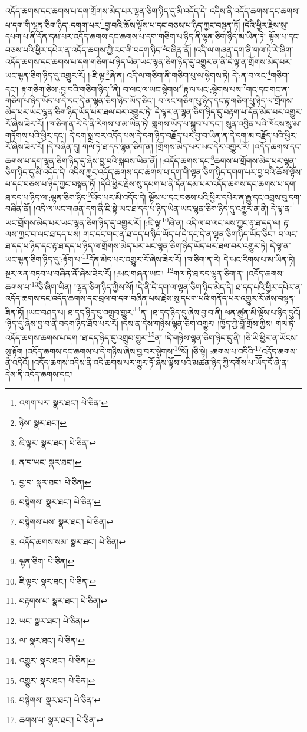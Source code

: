 འདོད་ཆགས་དང་ཆགས་པ་དག་གྲོགས་མེད་པར་ལྷན་ཅིག་ཉིད་དུ་མི་འདོད་དེ། འདིས་ནི་འདོད་ཆགས་དང་ཆགས་པ་དག་གི་ལྷན་ཅིག་ཉིད་:དགག་པར་\footnote{འགག་པར་  སྣར་ཐང་།  པེ་ཅིན། }བྱ་བའི་ཆོས་ལྟོས་པ་དང་བཅས་པ་ཉིད་ཀྱང་བསྟན་ཏོ། །དེའི་ཕྱིར་རྗེས་སུ་དཔག་པ་ནི་དོན་དམ་པར་འདོད་ཆགས་དང་ཆགས་པ་དག་གཅིག་པ་ཉིད་ནི་ལྷན་ཅིག་ཉིད་མ་ཡིན་ཏེ། ལྟོས་པ་དང་བཅས་པའི་ཕྱིར་དཔེར་ན་འདོད་ཆགས་ཀྱི་རང་གི་བདག་ཉིད་\footnote{ཉིས་  སྣར་ཐང་། }བཞིན་ནོ། །འདི་ལ་གཞན་དག་ནི་གལ་ཏེ་རེ་ཞིག་འདོད་ཆགས་དང་ཆགས་པ་དག་གཅིག་པ་ཉིད་ཡིན་ཡང་ལྷན་ཅིག་ཉིད་དུ་འགྱུར་ན་ནི་དེ་ལྟ་ན་གྲོགས་མེད་པར་ཡང་ལྷན་ཅིག་ཉིད་དུ་འགྱུར་རོ། །:ཇི་ལྟ་\footnote{ཇི་ལྟར་  སྣར་ཐང་།  པེ་ཅིན། }ཞེ་ན། འདི་ལ་གཅིག་ནི་གཅིག་པུ་ལ་སྙེགས་ཏེ། དེ་:ན་བ་ལང་\footnote{ན་བ་ཡང་  སྣར་ཐང་། }གཅིག་དང་། རྟ་གཅིག་ཅེས་:བྱ་བའི་གཅིག་ཉིད་\footnote{བྱ་བ་  སྣར་ཐང་།  པེ་ཅིན། }ནི། བ་ལང་ལ་ཡང་སྙེགས་\footnote{བསྙེགས་  སྣར་ཐང་།  པེ་ཅིན། }རྟ་ལ་ཡང་:སྙེགས་པས་\footnote{བསྙེགས་པས་  སྣར་ཐང་།  པེ་ཅིན། }གང་དང་གང་ན་གཅིག་པ་ཉིད་ཡོད་པ་དེ་དང་དེ་ན་ལྷན་ཅིག་ཉིད་ཡོད་ཅིང་། བ་ལང་གཅིག་པུ་ཉིད་དང་རྟ་གཅིག་པུ་ཉིད་ལ་གྲོགས་མེད་པར་ཡང་ལྷན་ཅིག་ཉིད་ཡོད་པར་ཐལ་བར་འགྱུར་ཏེ། དེ་ལྟར་ན་ལྷན་ཅིག་ཉིད་དུ་བརྟག་པ་དོན་མེད་པར་འགྱུར་རོ་ཞེས་ཟེར་རོ། །ཁ་ཅིག་ན་རེ་དེ་ནི་རིགས་པ་མ་ཡིན་ཏེ། གླགས་ཡོད་པ་སྒྲུབ་པ་དང་། སུན་འབྱིན་པའི་ཁོངས་སུ་མ་གཏོགས་པའི་ཕྱིར་དང་། དེ་དག་སྨྲ་བར་འདོད་པས་དེ་དག་ཉིད་བརྗོད་པར་བྱ་བ་ཡིན་ན་དེ་དག་མ་བརྗོད་པའི་ཕྱིར་རོ་ཞེས་ཟེར་རོ། །དེ་བཞིན་དུ། གལ་ཏེ་ཐ་དད་ལྷན་ཅིག་ན། །གྲོགས་མེད་པར་ཡང་དེར་འགྱུར་རོ། །འདོད་ཆགས་དང་ཆགས་པ་དག་ལྷན་ཅིག་ཉིད་དུ་ཞེས་བྱ་བའི་སྐབས་ཡིན་ནོ། །:འདོད་ཆགས་དང་\footnote{འདོད་ཆགས་སམ་  སྣར་ཐང་།  པེ་ཅིན། }ཆགས་པ་གྲོགས་མེད་པར་ལྷན་ཅིག་ཉིད་དུ་མི་འདོད་དེ། འདིས་ཀྱང་འདོད་ཆགས་དང་ཆགས་པ་དག་གི་ལྷན་ཅིག་ཉིད་དགག་པར་བྱ་བའི་ཆོས་ལྟོས་པ་དང་བཅས་པ་ཉིད་ཀྱང་བསྟན་ཏོ། །དེའི་ཕྱིར་རྗེས་སུ་དཔག་པ་ནི་དོན་དམ་པར་འདོད་ཆགས་དང་ཆགས་པ་དག་ཐ་དད་པ་ཉིད་ལ་:ལྷན་ཅིག་ཉིད་\footnote{ལྷན་ཅིག་  པེ་ཅིན། }ཡོད་པར་མི་འདོད་དེ། ལྟོས་པ་དང་བཅས་པའི་ཕྱིར་དཔེར་ན་རྒྱུ་དང་འབྲས་བུ་དག་བཞིན་ནོ། །འདི་ལ་ཡང་གཞན་དག་ནི་ཇི་སྟེ་ཡང་ཐ་དད་པ་ཉིད་ཡིན་ཡང་ལྷན་ཅིག་ཉིད་དུ་འགྱུར་ན་ནི། དེ་ལྟ་ན་ཡང་གྲོགས་མེད་པར་ཡང་ལྷན་ཅིག་ཉིད་དུ་འགྱུར་རོ། །:ཇི་ལྟ་\footnote{ཇི་ལྟར་  སྣར་ཐང་།  པེ་ཅིན། }ཞེ་ན། འདི་ལ་བ་ལང་ལས་ཀྱང་རྟ་ཐ་དད་ལ། རྟ་ལས་ཀྱང་བ་ལང་ཐ་དད་པས། གང་དང་གང་ན་ཐ་དད་པ་ཉིད་ཡོད་པ་དེ་དང་དེ་ན་ལྷན་ཅིག་ཉིད་ཡོད་ཅིང་། བ་ལང་ཐ་དད་པ་ཉིད་དང་རྟ་ཐ་དད་པ་ཉིད་ལ་གྲོགས་མེད་པར་ཡང་ལྷན་ཅིག་ཉིད་ཡོད་པར་ཐལ་བར་འགྱུར་ཏེ། དེ་ལྟ་ན་ཡང་ལྷན་ཅིག་ཉིད་དུ་:རྟོག་པ་\footnote{བརྟགས་པ་  སྣར་ཐང་།  པེ་ཅིན། }དོན་མེད་པར་འགྱུར་རོ་ཞེས་ཟེར་རོ། །ཁ་ཅིག་ན་རེ། དེ་ཡང་རིགས་པ་མ་ཡིན་ཏེ། སྔར་ལན་བཏབ་པ་བཞིན་ནོ་ཞེས་ཟེར་རོ། །:ཡང་གཞན་ཡང་། \footnote{ཡང་  སྣར་ཐང་།  པེ་ཅིན། }གལ་ཏེ་ཐ་དད་ལྷན་ཅིག་ན། །འདོད་ཆགས་ཆགས་པ་\footnote{ལ་  སྣར་ཐང་།  པེ་ཅིན། }ཅི་ཞིག་ཡིན། །ལྷན་ཅིག་ཉིད་ཀྱིས་སོ། །དེ་ནི་དེ་དག་ལ་ལྷན་ཅིག་ཉིད་མེད་དེ། ཐ་དད་པའི་ཕྱིར་དཔེར་ན་འདོད་ཆགས་དང་འདོད་ཆགས་དང་བྲལ་བ་དག་བཞིན་པས་རྗེས་སུ་དཔག་པའི་གནོད་པར་འགྱུར་རོ་ཞེས་བསྟན་ཟིན་ཏོ། །ཡང་བཤད་པ། ཐ་དད་ཉིད་དུ་འགྲུབ་གྱུར་\footnote{འགྱུར་  སྣར་ཐང་།  པེ་ཅིན། }ན། །ཐ་དད་ཉིད་དུ་ཞེས་བྱ་བ་ནི། ཕན་ཚུན་མི་ལྟོས་པ་ཉིད་དུའོ། །ཉིད་དུ་ཞེས་བྱ་བ་ནི་བདག་ཉིད་ཐོབ་པར་རོ། །དེས་ན་དེས་གཉིས་ལྷན་ཅིག་འགྱུར། །ཁྱོད་ཀྱི་བློ་གྲོས་ཀྱིས། གལ་ཏེ་འདོད་ཆགས་ཆགས་པ་དག །ཐ་དད་ཉིད་དུ་འགྲུབ་གྱུར་\footnote{འགྱུར་  སྣར་ཐང་།  པེ་ཅིན། }ན། །དེ་གཉིས་ལྷན་ཅིག་ཉིད་དུ་ནི། །ཅི་ཡི་ཕྱིར་ན་ཡོངས་སུ་རྟོག །འདོད་ཆགས་དང་ཆགས་པ་དེ་གཉིས་ཞེས་བྱ་བར་སྙེགས་\footnote{བསྙེགས་  སྣར་ཐང་།  པེ་ཅིན། }སོ། །ཅི་སྟེ། :ཆགས་པ་འདིའི་\footnote{ཆགས་པ་  སྣར་ཐང་།  པེ་ཅིན། }འདོད་ཆགས་ནི་འདིའོ། །འདོད་ཆགས་འདིས་ནི་འདི་ཆགས་པར་གྱུར་ཏོ་ཞེས་ལྟོས་པའི་མཚན་ཉིད་ཀྱི་དགོས་པ་ཡོད་དོ་ཞེ་ན། དེས་ནི་འདོད་ཆགས་དང་། 